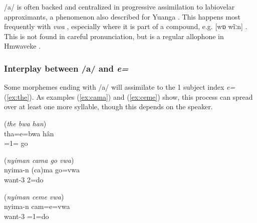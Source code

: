 	/a/ is often backed and centralized in progressive assimilation to labiovelar approximants, a phenomenon also described for Yuanga \parencite[129]{schooling_phonology_1992}. This happens most frequently with \textit{vwa} , especially where it is part of a compound, e.g.  [wɒ wĩːn]  \goodtilde [wo wĩːn]  . This is not found in careful pronunciation, but is a regular allophone in Hmwaveke \parencite[16]{campbell_phenomenon_1987}.%
	
%	
%	
	
	\subsubsection{Interplay between /a/ and \textit{e=} }
	
	Some morphemes ending with /a/ will assimilate to the 1 subject index \textit{e=} (\ref{ex:the}). As examples (\ref{ex:cama}) and (\ref{ex:ceme}) show, this process can spread over at least one more syllable, though this depends on the speaker.
	
	\ea
	\label{ex:the}
	(\textit{the bwa han})\\
	\gll tha=e=bwa hân\\
	 =1= go\\
	\glt {}
	\z
	
	\ea\label{ex:cama}
	(\textit{nyiman cama go vwa})\\
	\gll nyima-n (ca)ma go=vwa\\
	 want-3  2=do\\
	\glt {}
	\z
	
	\ea\label{ex:ceme}
	(\textit{nyiman ceme vwa})\\
	\gll nyima-n cam=e=vwa\\
	 want-3 =1=do\\
	\glt {}
	\z
	
%	
%	
	

	
%	
%	
%	
%	
%	
%	
	
